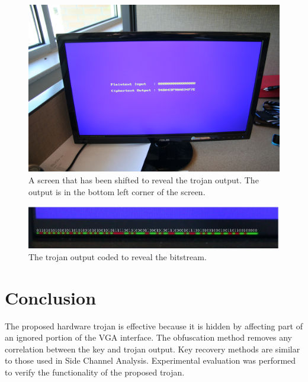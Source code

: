 		\begin{figure}[htbp]
		\centering
		\includegraphics[scale=.05]{screen}
		\caption{A screen that has been shifted to reveal the trojan output. The output is in the bottom left corner of the screen.}\label{fig:scr}
		\end{figure}


		\begin{figure}[htbp]
		\centering
		\includegraphics[scale=.2]{bits}
		\caption{The trojan output coded to reveal the bitstream. }\label{fig:bits}
		\end{figure}
\section{Conclusion}\label{sec::conclusion} 
	The proposed hardware trojan is effective because it is hidden by affecting part of an ignored portion of the VGA interface. The obfuscation method removes any correlation between the key and trojan output. Key recovery methods are similar to those used in Side Channel Analysis. Experimental evaluation was performed to verify the functionality of the proposed trojan. 












